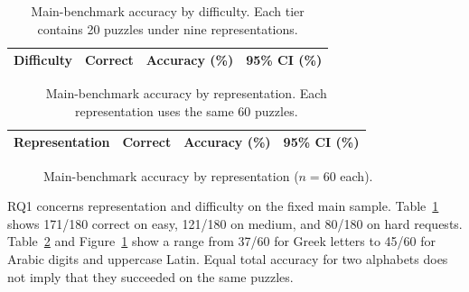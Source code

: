 \documentclass[11pt,a4paper]{article}
\begin{document}
\begin{table}[H]
\centering
\caption{Main-benchmark accuracy by difficulty. Each tier contains 20 puzzles under nine representations.}
\label{tab:main-difficulty}
\begin{tabular}{lrrr}
\toprule
Difficulty & Correct & Accuracy (\%) & 95\% CI (\%) \\
\midrule
%
\end{tabular}
\end{table}

\begin{table}[H]
\centering
\caption{Main-benchmark accuracy by representation. Each representation uses the same 60 puzzles.}
\label{tab:main-representation}
\begin{tabular}{lrrr}
\toprule
Representation & Correct & Accuracy (\%) & 95\% CI (\%) \\
\midrule
%
\end{tabular}
\end{table}

\begin{figure}[H]
\centering
{}
\caption{Main-benchmark accuracy by representation ($n=60$ each).}
\label{fig:main-representation}
\end{figure}

RQ1 concerns representation and difficulty on the fixed main sample. Table~\ref{tab:main-difficulty} shows 171/180 correct on easy, 121/180 on medium, and 80/180 on hard requests. Table~\ref{tab:main-representation} and Figure~\ref{fig:main-representation} show a range from 37/60 for Greek letters to 45/60 for Arabic digits and uppercase Latin. Equal total accuracy for two alphabets does not imply that they succeeded on the same puzzles.
\end{document}
